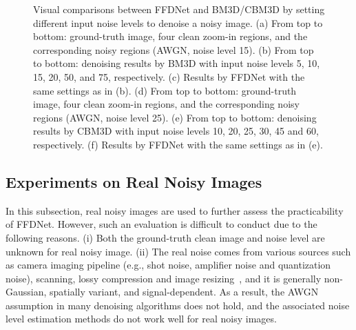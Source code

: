 \documentclass[journal]{IEEEtran}
\begin{document}
\begin{figure}[!htbp]
\begin{center}
\caption{Visual comparisons between FFDNet and BM3D/CBM3D by setting different input noise levels to denoise a noisy image. (a) From top to bottom: ground-truth image, four clean zoom-in regions, and the corresponding noisy regions (AWGN, noise level 15). (b) From top to bottom: denoising results by BM3D with input noise levels 5, 10, 15, 20, 50, and 75, respectively. (c) Results by FFDNet with the same settings as in (b). (d) From top to bottom: ground-truth image, four clean zoom-in regions, and the corresponding noisy regions (AWGN, noise level 25). (e) From top to bottom: denoising results by CBM3D with input noise levels 10, 20, 25, 30, 45 and 60, respectively. (f) Results by FFDNet with the same settings as in (e).}\label{fig_nm2}
\end{center}\vspace{-0.4cm}
\end{figure}


\subsection{Experiments on Real Noisy Images}


In this subsection, real noisy images are used to further assess the practicability of FFDNet. However, such an evaluation is difficult to conduct due to the following reasons. (i) Both the ground-truth clean image and noise level are unknown for real noisy image. (ii) The real noise comes from various sources such as camera imaging pipeline (e.g., shot noise, amplifier noise and quantization noise), scanning, lossy compression and image resizing~\cite{liu2008automatic,colom2014non}, and it is generally non-Gaussian, spatially variant, and signal-dependent. As a result, the AWGN assumption in many denoising algorithms does not hold, and the associated noise level estimation methods do not work well for real noisy images.
\end{document}
